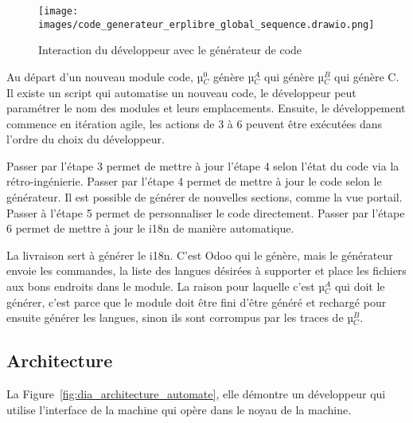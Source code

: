 \begin{figure}[htb]
\centering
\texttt{[image: images/code\_generateur\_erplibre\_global\_sequence.drawio.png]}
\caption{Interaction du développeur avec le générateur de code}
\label{fig:dia_sequence_gc}
\end{figure}

Au départ d’un nouveau module code, µ$_C^0$ génère µ$_C^A$ qui génère µ$_C^B$ qui génère C. Il existe un script qui automatise un nouveau code, le développeur peut paramétrer le nom des modules et leurs emplacements. Ensuite, le développement commence en itération agile, les actions de 3 à 6 peuvent être exécutées dans l’ordre du choix du développeur.


Passer par l’étape 3 permet de mettre à jour l’étape 4 selon l’état du code via la rétro-ingénierie. Passer par l’étape 4 permet de mettre à jour le code selon le générateur. Il est possible de générer de nouvelles sections, comme la vue portail. Passer à l’étape 5 permet de personnaliser le code directement. Passer par l’étape 6 permet de mettre à jour le i18n de manière automatique.

La livraison sert à générer le i18n. C’est Odoo qui le génère, mais le générateur envoie les commandes, la liste des langues désirées à supporter et place les fichiers aux bons endroits dans le module. La raison pour laquelle c’est µ$_C^A$ qui doit le générer, c’est parce que le module doit être fini d’être généré et rechargé pour ensuite générer les langues, sinon ils sont corrompus par les traces de µ$_C^B$.


\subsection{Architecture}

La Figure~\ref{fig:dia_architecture_automate}, elle démontre un développeur qui utilise l'interface de la machine qui opère dans le noyau de la machine.

